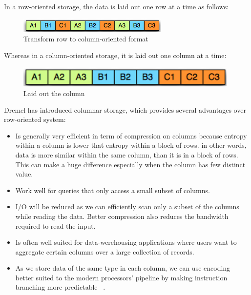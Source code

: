 \documentclass[9pt,twocolumn,twoside]{../../styles/osajnl}
\begin{document}
In a row-oriented storage, the data is laid out one row at a time as follows:


\begin{figure}[H]
 \centering
\includegraphics[scale=0.7]{images/image2}
\caption{Transform row to column-oriented format}
\end{figure}

Whereas in a column-oriented storage, it is laid out one column at a time:

\begin{figure}[H]
 \centering
\includegraphics[scale=0.7]{images/image3}
\caption{Laid out the column}
\end{figure}

Dremel has introduced columnar storage, which  provides several advantages over row-oriented system:

\begin{itemize}
  \item Is generally very efficient in term of compression on columns because entropy within a column is lower that entropy within a block of rows. in other words, data is more similar within the same column, than it is in a block of rows. This can make a huge difference especially when the column has few distinct value.
  \item Work well for queries that only access a small subset of columns. 
  \item I/O will be reduced as we can efficiently scan only a subset of the columns while reading the data. Better compression also reduces the bandwidth required to read the input.
  \item Is often well suited for data-werehousing applications where users want to aggregate certain columns over a large collection of records. 
  \item As we store data of the same type in each column, we can use encoding better suited to the modern processors’ pipeline by making instruction branching more predictable ~\cite{book-hadoop-apps}.
\end{itemize}
\end{document}
